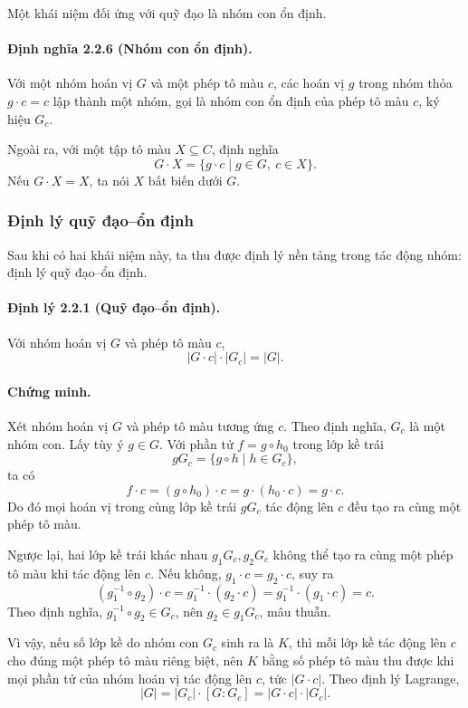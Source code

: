 \documentclass[11pt]{article}
\begin{document}
Một khái niệm đối ứng với quỹ đạo là nhóm con ổn định.

\paragraph{Định nghĩa 2.2.6 (Nhóm con ổn định).}
Với một nhóm hoán vị \(G\) và một phép tô màu \(c\), các hoán vị \(g\) trong
nhóm thỏa \(g\cdot c=c\) lập thành một nhóm, gọi là nhóm con ổn định của phép
tô màu \(c\), ký hiệu \(G_c\).

Ngoài ra, với một tập tô màu \(X\subseteq C\), định nghĩa
\[
  G\cdot X=\{g\cdot c\mid g\in G,\ c\in X\}.
\]
Nếu \(G\cdot X=X\), ta nói \(X\) bất biến dưới \(G\).

\subsubsection{Định lý quỹ đạo--ổn định}

Sau khi có hai khái niệm này, ta thu được định lý nền tảng trong tác động nhóm:
định lý quỹ đạo--ổn định.

\paragraph{Định lý 2.2.1 (Quỹ đạo--ổn định).}
Với nhóm hoán vị \(G\) và phép tô màu \(c\),
\[
  |G\cdot c|\cdot |G_c|=|G|.
\]

\paragraph{Chứng minh.}
Xét nhóm hoán vị \(G\) và phép tô màu tương ứng \(c\). Theo định nghĩa, \(G_c\)
là một nhóm con. Lấy tùy ý \(g\in G\). Với phần tử \(f=g\circ h_0\) trong lớp
kề trái
\[
  gG_c=\{g\circ h\mid h\in G_c\},
\]
ta có
\[
  f\cdot c=(g\circ h_0)\cdot c=g\cdot(h_0\cdot c)=g\cdot c.
\]
Do đó mọi hoán vị trong cùng lớp kề trái \(gG_c\) tác động lên \(c\) đều tạo ra
cùng một phép tô màu.

Ngược lại, hai lớp kề trái khác nhau \(g_1G_c,g_2G_c\) không thể tạo ra cùng
một phép tô màu khi tác động lên \(c\). Nếu không, \(g_1\cdot c=g_2\cdot c\),
suy ra
\[
  (g_1^{-1}\circ g_2)\cdot c
  =g_1^{-1}\cdot(g_2\cdot c)
  =g_1^{-1}\cdot(g_1\cdot c)
  =c.
\]
Theo định nghĩa, \(g_1^{-1}\circ g_2\in G_c\), nên \(g_2\in g_1G_c\), mâu
thuẫn.

Vì vậy, nếu số lớp kề do nhóm con \(G_c\) sinh ra là \(K\), thì mỗi lớp kề tác
động lên \(c\) cho đúng một phép tô màu riêng biệt, nên \(K\) bằng số phép tô
màu thu được khi mọi phần tử của nhóm hoán vị tác động lên \(c\), tức
\(|G\cdot c|\). Theo định lý Lagrange,
\[
  |G|=|G_c|\cdot [G:G_c]=|G\cdot c|\cdot |G_c|.
\]
\end{document}

